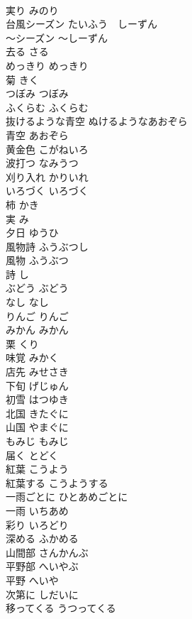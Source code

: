 \documentclass[8pt]{extreport}
\begin{document}
\begin{CJK}{UTF8}{min}
\\	実り	みのり	
\\	台風シーズン	たいふう　しーずん	
\\	〜シーズン	〜しーずん	
\\	去る	さる	
\\	めっきり	めっきり	
\\	菊	きく	
\\	つぼみ	つぼみ	
\\	ふくらむ	ふくらむ	
\\	抜けるような青空	ぬけるようなあおぞら	
\\	青空	あおぞら	
\\	黄金色	こがねいろ	
\\	波打つ	なみうつ	
\\	刈り入れ	かりいれ	
\\	いろづく	いろづく	
\\	柿	かき	
\\	実	み	
\\	夕日	ゆうひ	
\\	風物詩	ふうぶつし	
\\	風物	ふうぶつ	
\\	詩	し	
\\	ぶどう	ぶどう	
\\	なし	なし	
\\	りんご	りんご	
\\	みかん	みかん	
\\	栗	くり	
\\	味覚	みかく	
\\	店先	みせさき	
\\	下旬	げじゅん	
\\	初雪	はつゆき	
\\	北国	きたぐに	
\\	山国	やまぐに	
\\	もみじ	もみじ	
\\	届く	とどく	
\\	紅葉	こうよう	
\\	紅葉する	こうようする	
\\	一雨ごとに	ひとあめごとに	
\\	一雨	いちあめ	
\\	彩り	いろどり	
\\	深める	ふかめる	
\\	山間部	さんかんぶ	
\\	平野部	へいやぶ	
\\	平野	へいや	
\\	次第に	しだいに	
\\	移ってくる	うつってくる	

\end{CJK}
\end{document}
